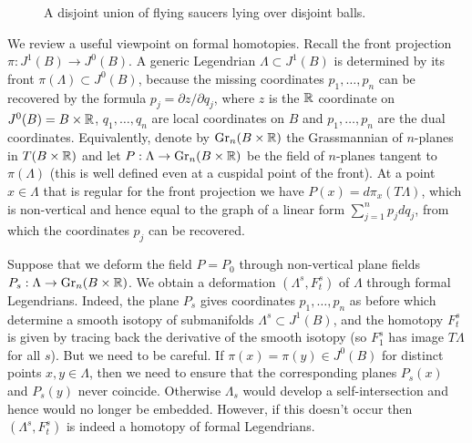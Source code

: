 \documentclass[11pt]{article}
\newcommand{\smaller}{\small}
\numberwithin{equation}{section}\providecommand{\dpl}{\displaystyle}
\theoremstyle{plain}
\theoremstyle{definition}
\begin{document}
\begin{figure}[htbp]
\begin{center}
\caption{\smaller A disjoint union of flying saucers lying over disjoint balls.}
\label{FigureDisjointUnion}
\end{center}
\end{figure}

We review a useful viewpoint on formal homotopies. Recall the front projection $\pi:J^1(B) \to J^0(B)$. A generic Legendrian $\Lambda \subset J^1(B)$ is determined by its front $\pi(\Lambda) \subset J^0(B)$, because the missing coordinates $p_1, \ldots, p_n$ can be recovered by the formula $p_j = \partial z / \partial q_j$, where $z$ is the $\mathbb{R}$ coordinate on $J^0(B)=B \times \mathbb{R}$, $q_1, \ldots, q_n$ are local coordinates on $B$ and $p_1, \ldots, p_n$ are the dual coordinates. Equivalently, denote by $\text{Gr}_n(B \times \mathbb{R})$ the Grassmannian of $n$-planes in $T(B \times \mathbb{R})$ and let $P: \Lambda \to \text{Gr}_n(B \times \mathbb{R})$ be the field of $n$-planes tangent to $\pi(\Lambda)$ (this is well defined even at a cuspidal point of the front). At a point $x \in \Lambda$ that is regular for the front projection we have $P(x)=d\pi_x(T \Lambda)$, which is non-vertical and hence equal to the graph of a linear form $\sum_{j=1}^n p_j dq_j$, from which the coordinates $p_j$ can be recovered.

Suppose that we deform the field $P=P_0$ through non-vertical plane fields \hbox{$P_s:\Lambda \to \text{Gr}_n(B \times \mathbb{R})$}. We obtain a deformation $(\Lambda^s,F_t^s)$ of $\Lambda$ through formal Legendrians. Indeed, the plane $P_s$ gives coordinates $p_1, \ldots, p_n$ as before which determine a smooth isotopy of submanifolds $\Lambda^s \subset J^1(B)$, and the homotopy $F^s_t$ is given by tracing back the derivative of the smooth isotopy (so $F^s_1$ has image $T \Lambda$ for all $s$). But we need to be careful. If $\pi(x)=\pi(y) \in J^0(B)$ for distinct points $x,y \in \Lambda$, then we need to ensure that the corresponding planes $P_s(x)$ and $P_s(y)$ never coincide. Otherwise $\Lambda_s$ would develop a self-intersection and hence would no longer be embedded. However, if this doesn't occur then $(\Lambda^s,F^s_t)$ is indeed a homotopy of formal Legendrians. 
\end{document}
